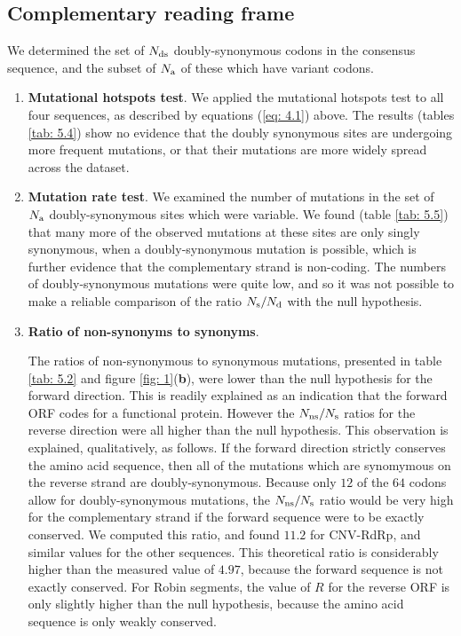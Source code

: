 \documentclass[unnumsec,webpdf,contemporary,large,namedate]{oup-authoring-template}%
\theoremstyle{thmstyleone}%
\theoremstyle{thmstyletwo}%
\theoremstyle{thmstylethree}%
\begin{document}
\subsection{Complementary reading frame}
\label{sec: 5.2}

We determined the set of $N_{\rm ds}$ doubly-synonymous codons in the consensus sequence, and
the subset of $N_{\rm a}$ of these which have variant codons.

\begin{enumerate}

\item{\bf Mutational hotspots test}. We applied the mutational hotspots test to all four sequences,
as described by equations (\ref{eq: 4.1}) above.
The results (tables \ref{tab: 5.4}) show no evidence that the doubly synonymous sites are
undergoing more frequent mutations, or that their mutations are more widely spread across the dataset.

\item{\bf Mutation rate test}. We examined the number of mutations in the set
of $N_{\rm a}$ doubly-synonymous sites which were variable. We found (table \ref{tab: 5.5})
that many more of the observed mutations at these sites are only singly synonymous, when
a doubly-synonymous mutation is possible, which is further evidence that the complementary
strand is non-coding. The numbers of doubly-synonymous mutations
were quite low, and so it was not possible to make a reliable comparison of the
ratio $N_{\rm s}/N_{\rm d}$ with the null hypothesis.

\item{\bf Ratio of non-synonyms to synonyms}.

The ratios of non-synonymous to synonymous mutations, presented in table \ref{tab: 5.2} 
and figure \ref{fig: 1}({\bf b}), were
lower than the null hypothesis for the forward direction. This is readily explained as an indication
that the forward ORF codes for a functional protein. However the $N_{\rm ns}/N_{\rm s}$
ratios for the reverse direction were all higher than the null hypothesis. This observation
is explained, qualitatively, as follows.
If the forward direction strictly conserves the amino acid sequence, then all of the mutations
which are synomymous on the reverse strand are doubly-synonymous. Because only
$12$ of the $64$ codons allow for doubly-synonymous mutations, the $N_{\rm ns}/N_{\rm s}$
ratio would be very high for the complementary strand if the forward sequence were to be exactly conserved.
We computed this ratio, and found $11.2$ for CNV-RdRp, and similar values for the other sequences.
This theoretical ratio is considerably higher than the measured value of $4.97$, because the
forward sequence is not exactly conserved. For Robin segments, the value of $R$ for the reverse
ORF is only slightly higher than the null hypothesis, because the amino acid sequence is only weakly
conserved.

\end{enumerate}
\end{document}

